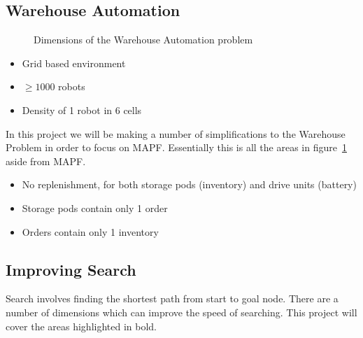 \documentclass[a4paper,11pt]{article}
\begin{document}
\subsection{Warehouse Automation}

\begin{figure}[H]
	\centering
	\small
	\caption{Dimensions of the Warehouse Automation problem}
	\label{wa-dimensions}
\end{figure}

\begin{itemize}
	\item Grid based environment
	\item $\ge 1000$ robots
	\item Density of 1 robot in 6 cells
\end{itemize}

In this project we will be making a number of simplifications to the Warehouse Problem in order to focus on MAPF. Essentially this is all the areas in figure~\ref{wa-dimensions} aside from MAPF.

\begin{itemize}
	\item No replenishment, for both storage pods (inventory) and drive units (battery)
	\item Storage pods contain only 1 order
	\item Orders contain only 1 inventory
\end{itemize}



\subsection{Improving Search}
Search involves finding the shortest path from start to goal node. There are a number of dimensions which can improve the speed of searching. This project will cover the areas highlighted in bold.

\end{document}
